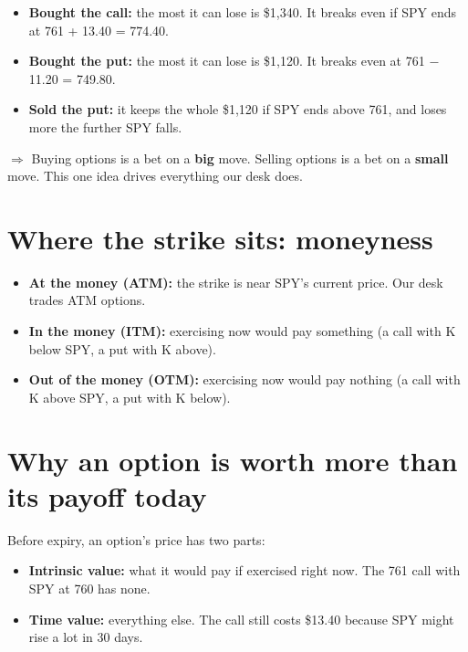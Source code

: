 \documentclass{article}
\begin{document}
\begin{itemize}

\item \textbf{Bought the call:} the most it can lose is \$1,340. It breaks even if SPY ends at 761 + 13.40 = 774.40.

\item \textbf{Bought the put:} the most it can lose is \$1,120. It breaks even at 761 \ensuremath{-} 11.20 = 749.80.

\item \textbf{Sold the put:} it keeps the whole \$1,120 if SPY ends above 761, and loses more the further SPY falls.

\end{itemize}

\textbf{$\Rightarrow$} Buying options is a bet on a \textbf{big} move. Selling options is a bet on a \textbf{small} move. This one idea drives everything our desk does.

\section{Where the strike sits: moneyness}

\begin{itemize}

\item \textbf{At the money (ATM):} the strike is near SPY's current price. Our desk trades ATM options.

\item \textbf{In the money (ITM):} exercising now would pay something (a call with K below SPY, a put with K above).

\item \textbf{Out of the money (OTM):} exercising now would pay nothing (a call with K above SPY, a put with K below).

\end{itemize}

\section{Why an option is worth more than its payoff today}

Before expiry, an option's price has two parts:

\begin{itemize}

\item \textbf{Intrinsic value:} what it would pay if exercised right now. The 761 call with SPY at 760 has none.

\item \textbf{Time value:} everything else. The call still costs \$13.40 because SPY might rise a lot in 30 days.

\end{itemize}
\end{document}
